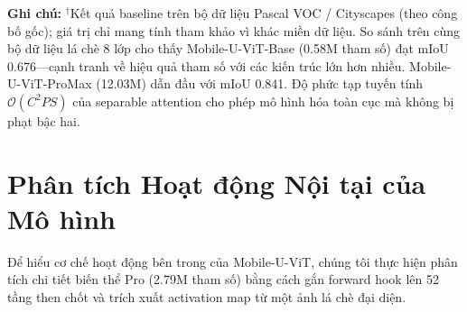 \documentclass[conference]{IEEEtran}
\begin{document}
\begin{table}[t]
\centering
\caption{So sánh với phương pháp tiên tiến trên phân đoạn nông nghiệp}
\label{tab:sota}
\end{table}

\noindent \textbf{Ghi chú:} $^\dagger$Kết quả baseline trên bộ dữ liệu Pascal VOC / Cityscapes (theo công bố gốc); giá trị chỉ mang tính tham khảo vì khác miền dữ liệu. So sánh trên cùng bộ dữ liệu lá chè 8 lớp cho thấy Mobile-U-ViT-Base (0.58M tham số) đạt mIoU 0.676---cạnh tranh về hiệu quả tham số với các kiến trúc lớn hơn nhiều. Mobile-U-ViT-ProMax (12.03M) dẫn đầu với mIoU 0.841. Độ phức tạp tuyến tính $\mathcal{O}(C^2PS)$ của separable attention cho phép mô hình hóa toàn cục mà không bị phạt bậc hai.

\section{Phân tích Hoạt động Nội tại của Mô hình}
\label{sec:activation}

Để hiểu cơ chế hoạt động bên trong của Mobile-U-ViT, chúng tôi thực hiện phân tích chi tiết biến thể Pro (2.79M tham số) bằng cách gắn forward hook lên 52 tầng then chốt và trích xuất activation map từ một ảnh lá chè đại diện.
\end{document}
